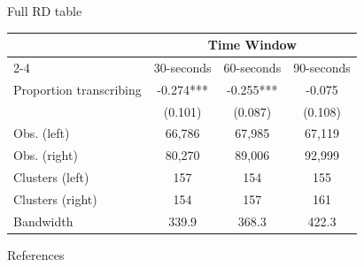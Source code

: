 \documentclass[aspectratio=169,xcolor=dvipsnames]{beamer}
\renewcommand{\footnotesize}{\fontsize{8pt}{11pt}\selectfont}
\begin{document}
\begin{frame}{Full RD table}
  \begin{table}
    \footnotesize
    \centering
    \begin{threeparttable}
      \begin{tabular*}{0.8\textwidth}{@{\extracolsep{\fill}}lccc}
        \toprule
        & \multicolumn{3}{c}{Time Window} \\
        \cmidrule(lr){2-4}
        & 30-seconds & 60-seconds & 90-seconds \\
        \midrule
        Proportion transcribing & -0.274*** & -0.255*** & -0.075 \\
        & (0.101) & (0.087) & (0.108) \\
        \midrule
        Obs. (left) & 66,786 & 67,985 & 67,119 \\
        Obs. (right) & 80,270 & 89,006 & 92,999 \\
        Clusters (left) & 157 & 154 & 155 \\
        Clusters (right) & 154 & 157 & 161 \\
        Bandwidth & 339.9 & 368.3 & 422.3 \\
        \bottomrule
      \end{tabular*}
    \end{threeparttable}
  \end{table}
\end{frame}

\begin{frame}[allowframebreaks]{References}
  
  
\end{frame}
\end{document}
